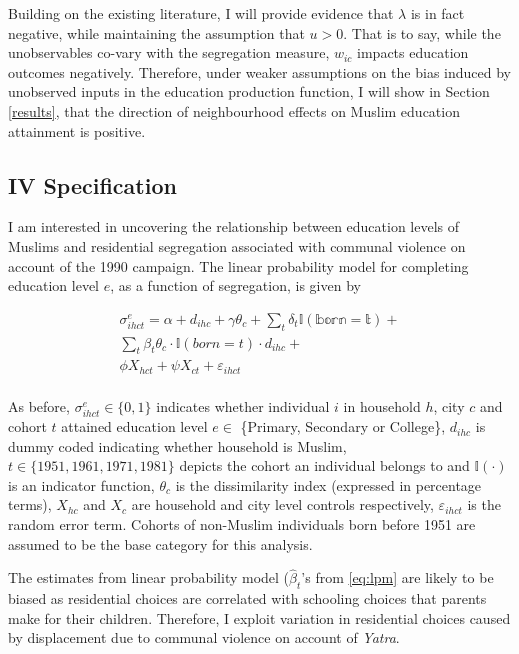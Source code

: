 \documentclass{article}
\begin{document}
Building on the existing literature, I will provide evidence that $\lambda$ is in fact negative, while maintaining the assumption that $u > 0$. That is to say, while the unobservables co-vary with the segregation measure, $w_{ic}$ impacts education outcomes negatively. Therefore, under weaker assumptions on the bias induced by unobserved inputs in the education production function, I will show in Section \ref{results}, that the direction of neighbourhood effects on Muslim education attainment is positive.  

\subsection{IV Specification}
I am interested in uncovering the relationship between education levels of Muslims and residential segregation associated with communal violence on account of the 1990 campaign. The linear probability model for completing education level $e$, as a function of segregation, is given by

\begin{equation}
\begin{split}\label{eq:lpm}
       \sigma_{ihct}^e = \alpha + d_{ihc} + \gamma \theta_c + \sum_{t}\delta_{t} \mathbb{I(born = t)} + \\
       \sum_{t} \beta_{t} \theta_c \cdot \mathbb{I} (born = t) \cdot d_{ihc}+ \\
       \phi X_{hct} + \psi X_{ct} + \varepsilon_{ihct} \\
\end{split}
\end{equation}

As before, $\sigma_{ihct}^e \in \{0, 1\}$ indicates whether individual $i$ in household $h$, city $c$ and cohort $t$ attained education level $e \in$ \{Primary, Secondary or College\}, $d_{ihc}$ is dummy coded indicating whether household is Muslim, $t \in \{1951, 1961, 1971, 1981 \}$ depicts the cohort an individual belongs to and $\mathbb{I(\cdot)}$ is an indicator function, $\theta_c$ is the dissimilarity index (expressed in percentage terms), $X_{hc}$ and $X_{c}$ are household and city level controls respectively, $\varepsilon_{ihct}$ is the random error term. Cohorts of non-Muslim individuals born before 1951 are assumed to be the base category for this analysis.

The estimates from linear probability model ($\hat{\beta}_t$'s from \eqref{eq:lpm} are likely to be biased as residential choices are correlated with schooling choices that parents make for their children. Therefore, I exploit variation in residential choices caused by displacement due to communal violence on account of \textit{Yatra}. 
\end{document}
